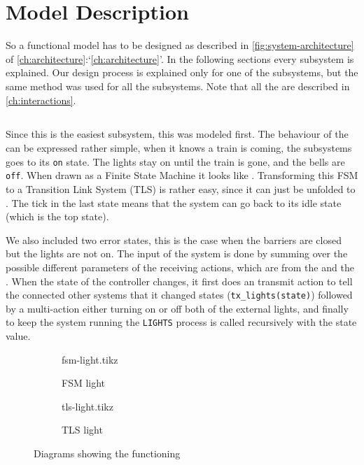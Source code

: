 \documentclass[final]{report}
\begin{document}
\chapter{Model Description}
So a functional model has to be designed as described in \cref{fig:system-architecture} of \cref{ch:architecture}:`\cref{ch:architecture}'.
In the following sections every subsystem is explained.
Our design process is explained only for one of the subsystems, but the same method was used for all the subsystems.
Note that all the  are described in \cref{ch:interactions}.


\section{}
Since this is the easiest subsystem, this was modeled first.
The behaviour of the  can be expressed rather simple, when it knows a train is coming, the subsystems goes to its \texttt{on} state.
The lights stay on until the train is gone, and the bells are \texttt{off}.
When drawn as a Finite State Machine it looks like \label{fig:fsm-light}.
Transforming this FSM to a Transition Link System (TLS) is rather easy, since it can just be unfolded to \label{fig:tls-light}.
The tick in the last state means that the system can go back to its idle state (which is the top state).

We also included two error states, this is the case when the barriers are closed but the lights are not on.
The input of the system is done by summing over the possible different parameters of the receiving actions, which are from the  and the .
When the state of the controller changes, it first does an transmit action to tell the connected other systems that it changed states (\texttt{tx\_lights(state)}) followed by a multi-action either turning on or off both of the external lights, and finally to keep the system running the \texttt{LIGHTS} process is called recursively with the state value.

\begin{figure}[H]
    \centering
        \begin{subfigure}[b]{0.4\textwidth}
    \centering
            {fsm-light.tikz}
            \caption{FSM light}
            \label{fig:fsm-light}
        \end{subfigure}
        \begin{subfigure}[b]{0.4\textwidth}
    \centering
            {tls-light.tikz}
            \caption{TLS light}
            \label{fig:tls-light}
        \end{subfigure}
    \caption{Diagrams showing the functioning }
    \label{fig:light}
\end{figure}
\end{document}
